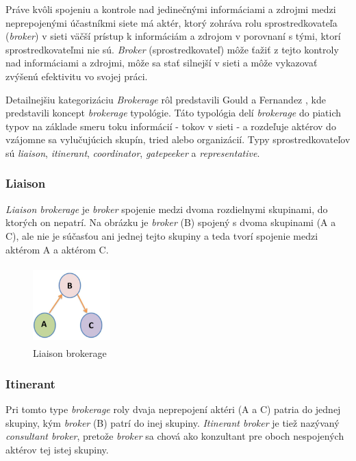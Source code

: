 \documentclass[slovak,master,public,dept460,male,cpdeclaration,oneside]{diploma}
\begin{document}
Práve kvôli spojeniu a kontrole nad jedinečnými informáciami a zdrojmi medzi neprepojenými účastníkmi siete má aktér, ktorý zohráva rolu sprostredkovateľa (\textit{broker}) v sieti väčší prístup k informáciám a zdrojom v porovnaní s tými, ktorí sprostredkovateľmi nie sú. \textit{Broker} (sprostredkovateľ) môže ťažiť z tejto kontroly nad informáciami a zdrojmi, môže sa stať silnejší v sieti a môže vykazovať zvýšenú efektivitu vo svojej práci. \cite{16}


Detailnejšiu kategorizáciu \textit{Brokerage} rôl predstavili Gould a Fernandez \cite{15}, kde predstavili koncept \textit{brokerage} typológie. Táto typológia delí \textit{brokerage} do piatich typov na základe smeru toku informácií - tokov v sieti - a rozdeľuje aktérov do vzájomne sa vylučujúcich skupín, tried alebo organizácií.
Typy sprostredkovateľov sú \textit{liaison}, \textit{itinerant}, \textit{coordinator}, \textit{gatepeeker} a \textit{representative}.

\subsubsection{Liaison}

\textit{Liaison brokerage} je \textit{broker} spojenie medzi dvoma rozdielnymi skupinami, do ktorých on nepatrí. Na obrázku je \textit{broker} (B) spojený s dvoma skupinami (A a C), ale nie je súčasťou ani jednej tejto skupiny a teda tvorí spojenie medzi aktérom A a aktérom C. 

\begin{figure}[H]
\centering
\includegraphics[width=3cm, height=3cm]{figures/liaison}
\caption{Liaison brokerage}
\end{figure}

\subsubsection{Itinerant}
Pri tomto type \textit{brokerage} roly dvaja neprepojení aktéri (A a C) patria do jednej skupiny, kým \textit{broker} (B) patrí do inej skupiny. \textit{Itinerant broker} je tiež nazývaný \textit{consultant broker}, pretože \textit{broker} sa chová ako konzultant pre oboch nespojených aktérov tej istej skupiny.
\end{document}
